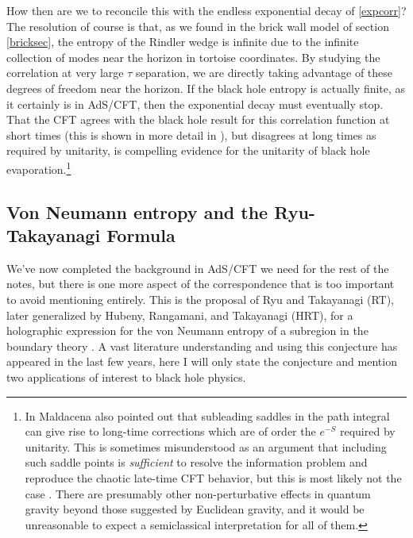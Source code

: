 \documentclass[12pt]{article}
\begin{document}

How then are we to reconcile this with the endless exponential decay of \eqref{expcorr}? The resolution of course is that, as we found in the brick wall model of section \ref{bricksec}, the entropy of the Rindler wedge is infinite due to the infinite collection of modes near the horizon in tortoise coordinates.  By studying the correlation at very large $\tau$ separation, we are directly taking advantage of these degrees of freedom near the horizon.  If the black hole entropy is actually finite, as it certainly is in AdS/CFT, then the exponential decay must eventually stop.  That the CFT agrees with the black hole result for this correlation function at short times (this is shown in more detail in \cite{Papadodimas:2012aq}), but disagrees at long times as required by unitarity, is compelling evidence for the unitarity of black hole evaporation.\footnote{In \cite{Maldacena:2001kr} Maldacena also pointed out that subleading saddles in the path integral can give rise to long-time corrections which are of order the $e^{-S}$ required by unitarity.  This is sometimes misunderstood as an argument that including such saddle points is \textit{sufficient} to resolve the information problem and reproduce the chaotic late-time CFT behavior, but this is most likely not the case \cite{Barbon:2003aq}. There are presumably other non-perturbative effects in quantum gravity beyond those suggested by Euclidean gravity, and it would be unreasonable to expect a semiclassical interpretation for all of them.}  

\subsection{Von Neumann entropy and the Ryu-Takayanagi Formula}\label{RTsec} 
We've now completed the background in AdS/CFT we need for the rest of the notes, but there is one more aspect of the correspondence that is too important to avoid mentioning entirely.  This is the proposal of Ryu and Takayanagi (RT), later generalized by Hubeny, Rangamani, and Takayanagi (HRT), for a holographic expression for the von Neumann entropy of a subregion in the boundary theory \cite{Ryu:2006bv,Hubeny:2007xt}.  A vast literature understanding and using this conjecture has appeared in the last few years, here I will only state the conjecture and mention two applications of interest to black hole physics.  
\end{document}
